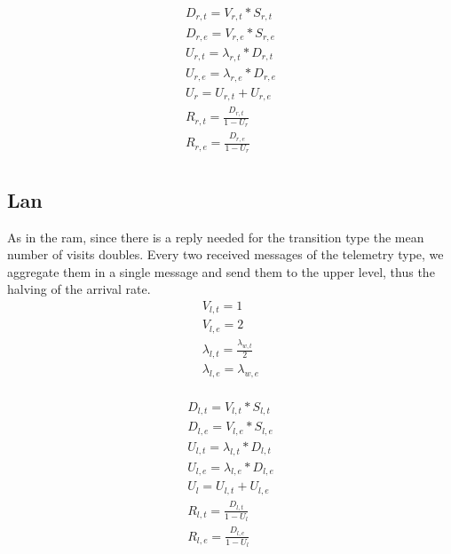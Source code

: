 \documentclass[11pt]{article}
\begin{document}
\begin{equation}
    \begin{array}{l}
        D_{r, t} = V_{r, t} * S_{r, t} \\
        D_{r, e} = V_{r, e} * S_{r, e} \\
        U_{r, t} = \lambda_{r, t} * D_{r, t} \\
        U_{r, e} = \lambda_{r, e} * D_{r, e} \\
        U_{r} = U_{r, t} + U_{r, e} \\
        R_{r, t} = \frac{D_{r, t}}{1 - U_{r}} \\
        R_{r, e} = \frac{D_{r, e}}{1 - U_{r}} \\
    \end{array}
\end{equation}

\subsection{Lan}
As in the ram, since there is a reply needed for the transition type the mean number of visits doubles.
Every two received messages of the telemetry type, we aggregate them in a single message and send them to the upper level, thus the halving of the arrival rate.
\begin{equation}
    \begin{array}{l}
        V_{l, t} = 1 \\
        V_{l, e} = 2 \\ %
        \lambda_{l, t} = \frac{\lambda_{w, t}}{2} \\ %
        \lambda_{l, e} = \lambda_{w, e} \\
    \end{array}
\end{equation}

\begin{equation}
    \begin{array}{l}
        D_{l, t} = V_{l, t} * S_{l, t} \\
        D_{l, e} = V_{l, e} * S_{l, e} \\
        U_{l, t} = \lambda_{l, t} * D_{l, t} \\
        U_{l, e} = \lambda_{l, e} * D_{l, e} \\
        U_{l} = U_{l, t} + U_{l, e} \\
        R_{l, t} = \frac{D_{l, t}}{1 - U_{l}} \\
        R_{l, e} = \frac{D_{l, e}}{1 - U_{l}} \\
    \end{array}
\end{equation}
\end{document}
